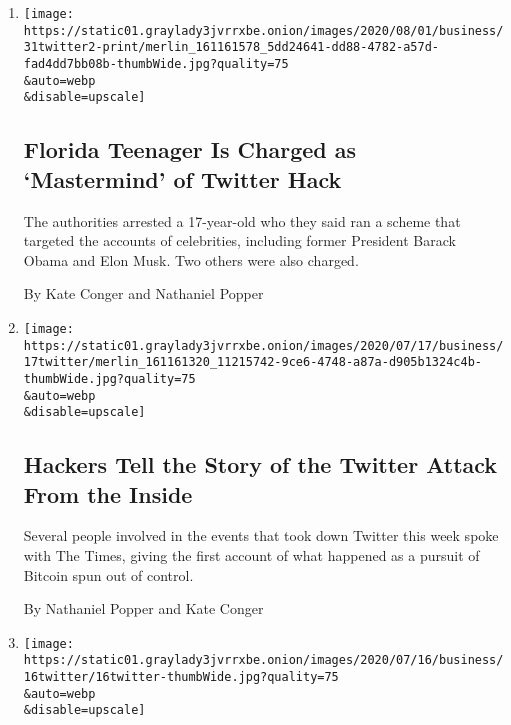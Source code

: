 \begin{enumerate}
\def\labelenumi{\arabic{enumi}.}
\item
  \href{/2020/07/31/technology/twitter-hack-arrest.html}{}

  \texttt{[image: https://static01.graylady3jvrrxbe.onion/images/2020/08/01/business/31twitter2-print/merlin\_161161578\_5dd24641-dd88-4782-a57d-fad4dd7bb08b-thumbWide.jpg?quality=75\\\&auto=webp\\\&disable=upscale]}

  \hypertarget{florida-teenager-is-charged-as-mastermind-of-twitter-hack}{%
  \subsection{Florida Teenager Is Charged as `Mastermind' of Twitter
  Hack}\label{florida-teenager-is-charged-as-mastermind-of-twitter-hack}}

  The authorities arrested a 17-year-old who they said ran a scheme that
  targeted the accounts of celebrities, including former President
  Barack Obama and Elon Musk. Two others were also charged.

  By Kate Conger and Nathaniel Popper
\item
  \href{/2020/07/17/technology/twitter-hackers-interview.html}{}

  \texttt{[image: https://static01.graylady3jvrrxbe.onion/images/2020/07/17/business/17twitter/merlin\_161161320\_11215742-9ce6-4748-a87a-d905b1324c4b-thumbWide.jpg?quality=75\\\&auto=webp\\\&disable=upscale]}

  \hypertarget{hackers-tell-the-story-of-the-twitter-attack-from-the-inside}{%
  \subsection{Hackers Tell the Story of the Twitter Attack From the
  Inside}\label{hackers-tell-the-story-of-the-twitter-attack-from-the-inside}}

  Several people involved in the events that took down Twitter this week
  spoke with The Times, giving the first account of what happened as a
  pursuit of Bitcoin spun out of control.

  By Nathaniel Popper and Kate Conger
\item
  \href{/2020/07/16/technology/twitter-hack-investigation.html}{}

  \texttt{[image: https://static01.graylady3jvrrxbe.onion/images/2020/07/16/business/16twitter/16twitter-thumbWide.jpg?quality=75\\\&auto=webp\\\&disable=upscale]}


\end{enumerate}
